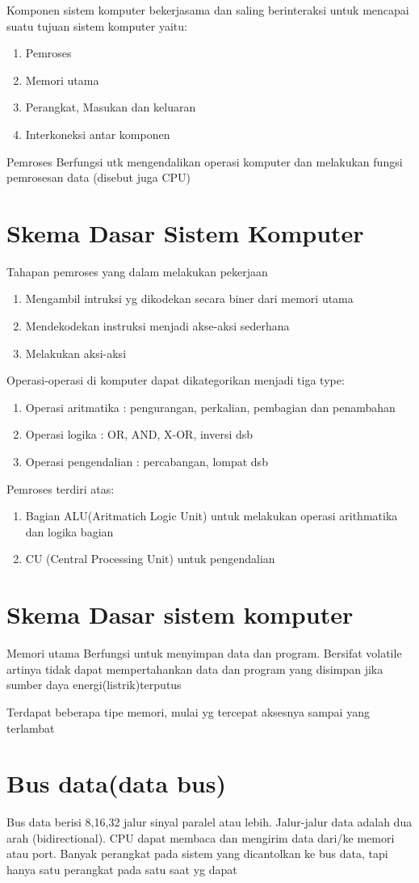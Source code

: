 Komponen sistem komputer bekerjasama dan saling berinteraksi untuk mencapai suatu tujuan sistem komputer yaitu:
\begin{enumerate}
\item Pemroses
\item Memori utama
\item Perangkat, Masukan dan keluaran
\item Interkoneksi antar komponen
\end{enumerate}

Pemroses
Berfungsi utk mengendalikan operasi komputer dan melakukan fungsi pemrosesan data (disebut juga CPU)

\section{Skema Dasar Sistem Komputer}
Tahapan pemroses yang dalam melakukan pekerjaan
\begin{enumerate}
\item Mengambil intruksi yg dikodekan secara biner dari memori utama
\item Mendekodekan instruksi menjadi akse-aksi sederhana
\item Melakukan aksi-aksi
\end{enumerate}

Operasi-operasi di komputer dapat dikategorikan menjadi tiga type:
\begin{enumerate}
\item Operasi aritmatika : pengurangan, perkalian, pembagian dan penambahan
\item Operasi logika : OR, AND, X-OR, inversi dsb
\item Operasi pengendalian : percabangan, lompat dsb
\end{enumerate}

Pemroses terdiri atas:
\begin{enumerate}
\item Bagian ALU(Aritmatich Logic Unit) untuk melakukan operasi arithmatika dan logika bagian
\item CU (Central Processing Unit) untuk pengendalian 
\end{enumerate}

\section{Skema Dasar sistem komputer}
Memori utama
Berfungsi untuk menyimpan data dan program. Bersifat volatile artinya tidak dapat mempertahankan data dan program yang disimpan jika sumber daya energi(listrik)terputus

Terdapat beberapa tipe memori, mulai yg tercepat aksesnya sampai yang terlambat

\section{Bus data(data bus)}
Bus data berisi 8,16,32 jalur sinyal paralel atau lebih. Jalur-jalur data adalah dua arah (bidirectional). CPU dapat membaca dan mengirim data dari/ke memori atau port. 
Banyak perangkat pada sistem yang dicantolkan ke bus data, tapi hanya satu perangkat pada satu saat yg dapat